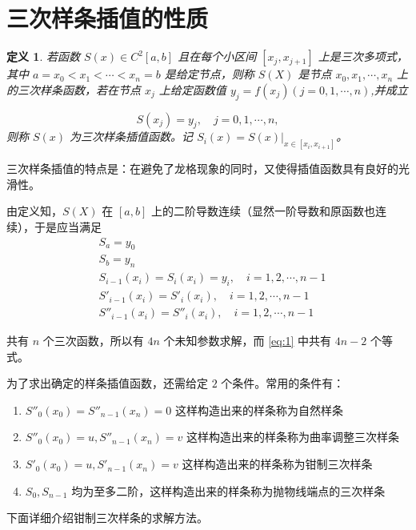 \documentclass{ctexart}
\newtheorem{definition}{定义}[section]
\numberwithin{equation}{section}
\begin{document}
\section{三次样条插值的性质}



\begin{definition}
    若函数 $S(x)\in C^2[a,b]$ 且在每个小区间 $[x_j,x_{j+1}]$ 上是三次多项式，其中 $a=x_0<x_1<\cdots<x_n=b$ 是给定节点，则称 $S(X)$ 是节点 $x_0,x_1,\cdots,x_n$ 上的三次样条函数，若在节点 $x_j$ 上给定函数值 $y_j = f(x_j)(j=0,1,\cdots,n)$,并成立

    \begin{equation}
        S(x_j)=y_j,\quad j=0,1,\cdots,n,
    \end{equation}
    则称 $S(x)$ 为三次样条插值函数。记 $S_i(x)=S(x)|_{x\in [x_i,x_{i+1}]}$。
\end{definition}

三次样条插值的特点是：在避免了龙格现象的同时，又使得插值函数具有良好的光滑性。

由定义知，$S(X)$ 在 $[a,b]$ 上的二阶导数连续（显然一阶导数和原函数也连续），于是应当满足
\begin{equation}
\begin{aligned}
     &S_{a} = y_0\\
    &S_{b} = y_n\\
    &S_{i-1}(x_i) = S_{i}(x_i) = y_i,\quad i = 1,2,\cdots,n-1\\
    &S'_{i-1}(x_i) = S'_{i}(x_i),\quad i = 1,2,\cdots,n-1\\
     &S''_{i-1}(x_i) = S''_{i}(x_i),\quad i = 1,2,\cdots,n-1
\end{aligned}
\label{eq:1}
\end{equation}

共有 $n$ 个三次函数，所以有 $4n$ 个未知参数求解，而 \eqref{eq:1} 中共有 $4n-2$ 个等式。

为了求出确定的样条插值函数，还需给定 $2$ 个条件。常用的条件有：

\begin{enumerate}
    \item $S''_0(x_0)=S''_{n-1}(x_n)=0$ 这样构造出来的样条称为自然样条
    \item $S''_0(x_0)=u,S''_{n-1}(x_n)=v$ 这样构造出来的样条称为曲率调整三次样条
    \item $S'_0(x_0)=u,S'_{n-1}(x_n)=v$ 这样构造出来的样条称为钳制三次样条
    \item $S_0,S_{n-1}$ 均为至多二阶，这样构造出来的样条称为抛物线端点的三次样条
\end{enumerate}
下面详细介绍钳制三次样条的求解方法。
\end{document}
